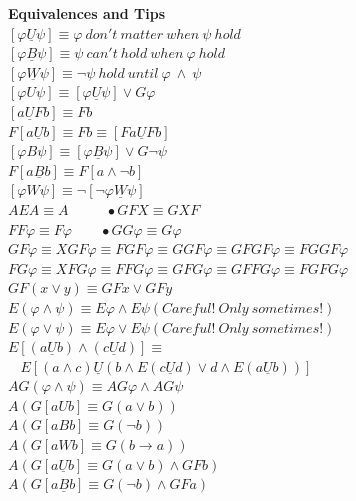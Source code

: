 \documentclass{article}
\begin{document}
\begin{multicols}{4}
\textbf{Equivalences and Tips} \\
$[\varphi \underline{U} \psi] \equiv \varphi\ don't\ matter\ when\ \psi\ hold $ \\
$[\varphi \underline{B} \psi] \equiv \psi\ can't\ hold\ when\ \varphi\ hold $ \\
$[\varphi \underline{W} \psi] \equiv \neg\psi\ hold\ until\ \varphi\ \wedge\ \psi $ \\
$[\varphi U \psi] \equiv [\varphi \underline{U} \psi] \vee G\varphi$ \\
$[a \underline{U} Fb] \equiv Fb $ \\
$F[a \underline{U} b] \equiv Fb \equiv [Fa \underline{U} Fb] $ \\
$[\varphi B \psi] \equiv [\varphi \underline{B} \psi] \vee G\neg\psi$ \\
$F[a \underline{B} b] \equiv F[a \wedge \neg b] $ \\
$[\varphi W \psi] \equiv \neg[\neg\varphi \underline{W} \psi]$ \\
$AEA \equiv A\ \ \ \ \ \ \ \ \ \ \ \ \bullet GFX \equiv GXF $ \\
$FF\varphi \equiv F\varphi \ \ \ \ \ \ \ \ \ \bullet GG\varphi \equiv G\varphi$\\
$GF\varphi \equiv XGF\varphi\equiv FGF\varphi \equiv GGF\varphi\equiv GFGF\varphi \equiv FGGF\varphi$\\
$FG\varphi\equiv XFG\varphi \equiv FFG\varphi \equiv GFG\varphi \equiv GFFG\varphi \equiv FGFG\varphi$ \\
$GF(x \vee y) \equiv GFx \vee GFy $ \\
$E(\varphi \wedge \psi) \equiv E\varphi \wedge E \psi (Careful!\ Only\ sometimes!) $ \\
$E(\varphi \vee \psi) \equiv E\varphi \vee E\psi (Careful!\ Only\ sometimes!)$ \\
$E[(a \underline{U} b) \wedge (c \underline{U} d)] \equiv $ \\
$\ \ \ \ E[(a \wedge c) \underline{U} (b \wedge E(c \underline{U} d) \vee d \wedge E(a \underline{U} b))] $ \\
$AG(\varphi \wedge \psi) \equiv AG\varphi \wedge AG\psi $ \\
$A(G[a U b] \equiv G(a \vee b))$ \\
$A(G[a B b] \equiv G(\neg b))$ \\
$A(G[a W b] \equiv G(b \rightarrow a))$ \\
$A(G[a \underline{U} b] \equiv G(a \vee b) \wedge GFb)$ \\
$A(G[a \underline{B} b] \equiv G(\neg b) \wedge GFa)$ \\

\end{multicols}
\end{document}
